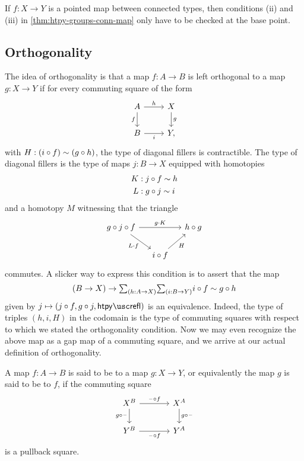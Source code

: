 \begin{rmk}
  If $f:X\to Y$ is a pointed map between connected types, then conditions (ii) and (iii) in \cref{thm:htpy-groups-conn-map} only have to be checked at the base point.
\end{rmk}

\subsection{Orthogonality}

The idea of orthogonality is that a map $f:A\to B$ is left orthogonal to a map $g:X\to Y$ if for every commuting square of the form
\begin{equation*}
  \begin{tikzcd}
    A \arrow[d,swap,"f"] \arrow[r,"h"] & X \arrow[d,"g"] \\
    B \arrow[r,swap,"i"] & Y,
  \end{tikzcd}
\end{equation*}
with $H:(i\circ f)\sim (g\circ h)$, the type of diagonal fillers is contractible. The type of diagonal fillers is the type of maps $j:B\to X$ equipped with homotopies
\begin{align*}
  K & : j\circ f\sim h \\
  L & : g\circ j\sim i
\end{align*}
and a homotopy $M$ witnessing that the triangle
\begin{equation*}
  \begin{tikzcd}[column sep=small]
    g\circ j\circ f \arrow[rr,"g\cdot K"] \arrow[dr,swap,"L\cdot f"] & & h\circ g \\
    & i\circ f \arrow[ur,swap,"H"]
  \end{tikzcd}
\end{equation*}
commutes. A slicker way to express this condition is to assert that the map
\begin{equation*}
   (B\to X)\to \sm{h:A\to X}{i:B\to Y} i\circ f\htpy g\circ h
\end{equation*}
given by $j\mapsto(j\circ f,g\circ j,\htpyrefl)$ is an equivalence. Indeed, the type of triples $(h,i,H)$ in the codomain is the type of commuting squares with respect to which we stated the orthogonality condition. Now we may even recognize the above map as a gap map of a commuting square, and we arrive at our actual definition of orthogonality.

\begin{defn}
  A map $f:A\to B$ is said to be  to a map $g:X\to Y$, or equivalently the map $g$ is said to be  to $f$, if the commuting square
  \begin{equation*}
    \begin{tikzcd}[column sep=large]
      X^B \arrow[r,"\blank\circ f"] \arrow[d,swap,"g\circ\blank"] & X^A \arrow[d,"g\circ\blank"] \\
      Y^B \arrow[r,swap,"\blank\circ f"] & Y^A
    \end{tikzcd}
  \end{equation*}
  is a pullback square.
\end{defn}

